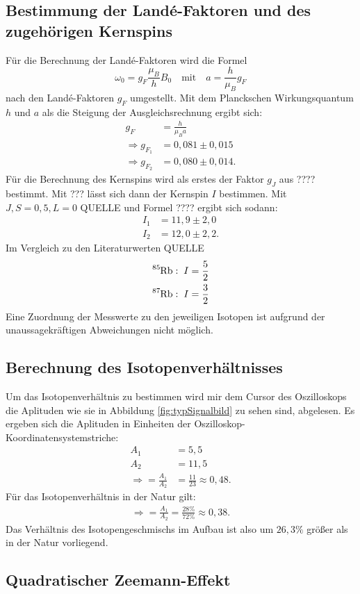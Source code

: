 \subsection{Bestimmung der Landé-Faktoren und des zugehörigen Kernspins}
Für die Berechnung der Landé-Faktoren wird die Formel
\begin{equation}
  \omega_0=g_F\frac{\mu_B}{h}B_0\quad \text{mit}\quad a=\frac{h}{\mu_B}{g_F}
\end{equation}
nach den Landé-Faktoren $g_F$ umgestellt. Mit dem Planckschen Wirkungsquantum $h$ und $a$ als die Steigung der Ausgleichsrechnung ergibt sich:
\begin{align*}
  g_F&=\frac{h}{\mu_Ba}\\
  \Rightarrow g_{F_1}&= 0,081 \pm 0,015\\
  \Rightarrow g_{F_2}&= 0,080 \pm 0,014.
\end{align*}
Für die Berechnung des Kernspins wird als erstes der Faktor $g_J$ aus ???? bestimmt. Mit ??? lässt sich dann der Kernspin $I$ bestimmen. Mit $J,S=0,5,L=0$ QUELLE und Formel ???? ergibt sich sodann:
\begin{align*}
  I_1&= 11,9\pm2,0\\
  I_2&=12,0\pm2,2.
\end{align*}
Im Vergleich zu den Literaturwerten QUELLE
\begin{align*}
  \ce{^{85}Rb}&:\; I=\frac{5}{2}\\
  \ce{^{87}Rb}&:\; I=\frac{3}{2}
\end{align*}
Eine Zuordnung der Messwerte zu den jeweiligen Isotopen ist aufgrund der unaussagekräftigen Abweichungen nicht möglich.
\subsection{Berechnung des Isotopenverhältnisses}
Um das Isotopenverhältnis zu bestimmen wird mir dem Cursor des Oszilloskops die Aplituden wie sie in Abbildung \ref{fig:typSignalbild} zu sehen sind, abgelesen.
Es ergeben sich die Aplituden in Einheiten der Oszilloskop-Koordinatensystemstriche:
\begin{align*}
A_1&= 5,5\\
A_2&= 11,5\\
\Rightarrow =\frac{A_1}{A_2}&=\frac{11}{23}\approx 0,48.
\end{align*}
Für das Isotopenverhältnis in der Natur gilt:
\begin{align*}
\Rightarrow =\frac{A_1}{A_2}=\frac{28\%}{72\%}\approx 0,38.
\end{align*}
Das Verhältnis des Isotopengeschmischs im Aufbau ist also um $26,3\%$ größer als in der Natur vorliegend.
\subsection{Quadratischer Zeemann-Effekt}
